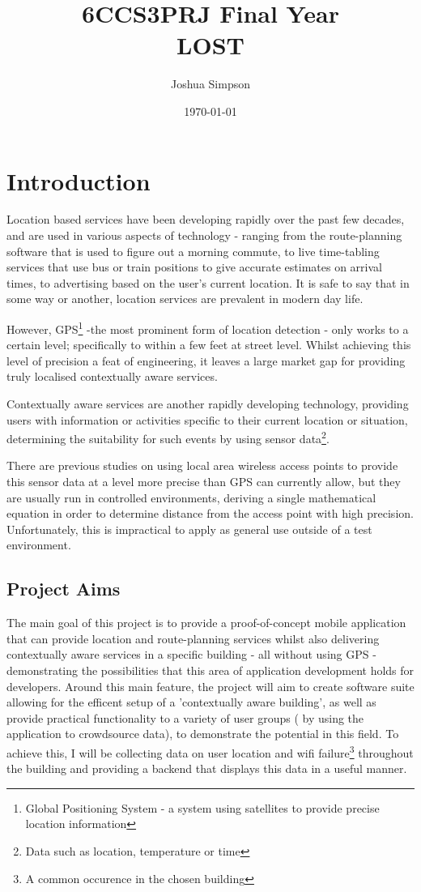 \documentclass[11pt]{informatics-report}
\title{6CCS3PRJ Final Year\\\vspace{0.2cm} LOST}
\author{Joshua Simpson}
\date{\today}
\begin{document}
\createFrontMatter
\onehalfspacing
\tableofcontents
\doublespacing


\chapter{Introduction}
Location based services have been developing rapidly over the past few decades, and are used in various aspects of technology - ranging from the route-planning software that is used to figure out a morning commute, to live time-tabling services that use bus or train positions to give accurate estimates on arrival times, to advertising based on the user's current location. It is safe to say that in some way or another, location services are prevalent in modern day life.

However, GPS\footnote{ Global Positioning System - a system using satellites to provide precise location information} -the most prominent form of location detection - only works to a certain level;  specifically to within a few feet at street level\cite{cook2005indoor}. Whilst achieving this level of precision a feat of engineering, it leaves a large market gap for providing truly localised contextually aware services. 

Contextually aware services are another rapidly developing technology, providing users with information or activities specific to their current location or situation, determining the suitability for such events by using sensor data\footnote{ Data such as location, temperature or time }. 

There are previous studies on using local area wireless access points to provide this sensor data at a level more precise than GPS can currently allow, but they are usually run in controlled environments, deriving a single mathematical equation in order to determine distance from the access point with high precision\cite{996891}. Unfortunately, this is impractical to apply as general use outside of a test environment.
\newline \newline 


\section{Project Aims}

The main goal of this project is to provide a proof-of-concept mobile application that can provide location and route-planning services whilst also delivering contextually aware services in a specific building - all without using GPS - demonstrating the possibilities that this area of application development holds for developers. Around this main feature, the project will aim to create software suite allowing for the efficent setup of a 'contextually aware building', as well as provide practical functionality to a variety of user groups ( by using the application to crowdsource data), to demonstrate the potential in this field. To achieve this, I will be collecting data on user location and wifi failure\footnote{A common occurence in the chosen building} throughout the building and providing a backend that displays this data in a useful manner.
\end{document}
